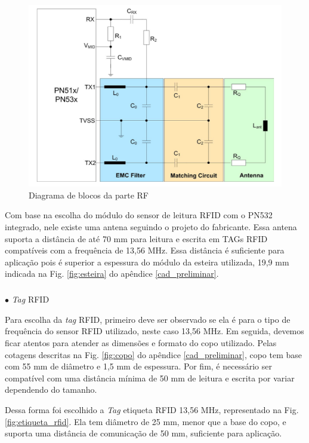     \begin{figure}[H]
    \centering
    \includegraphics[scale=0.55]{figuras/eletronica/esquematicos/antena_RFID.png}
    \caption{Diagrama de blocos da parte RF}
    \label{fig:antena_RFID}
    \end{figure}

   Com base na escolha do módulo do sensor de leitura RFID com o PN532 integrado, nele existe uma antena seguindo o projeto do fabricante. Essa antena suporta a distância de até 70 mm para leitura e escrita em TAGs RFID compatíveis com a frequência de 13,56 MHz. Essa distância é suficiente para aplicação pois é superior a espessura do módulo da esteira utilizada, 19,9 mm indicada na Fig. \ref{fig:esteira} do apêndice \ref{cad_preliminar}.
   
   \subparagraph*{} $\bullet$ \textit{Tag} RFID \hfill
   
   Para escolha da \textit{tag} RFID, primeiro deve ser observado se ela é para o tipo de frequência do sensor RFID utilizado, neste caso 13,56 MHz. Em seguida, devemos ficar atentos para atender as dimensões e formato do copo utilizado. Pelas cotagens descritas na Fig. \ref{fig:copo} do apêndice \ref{cad_preliminar},  copo tem base com 55 mm de diâmetro e 1,5 mm de espessura. Por fim, é necessário ser compatível com uma distância mínima de 50 mm de leitura e escrita por variar dependendo do tamanho.
   
   Dessa forma foi escolhido a \textit{Tag} etiqueta RFID 13,56 MHz, representado na Fig. \ref{fig:etiqueta_rfid}. Ela tem diâmetro de 25 mm, menor que a base do copo, e suporta uma distância de comunicação de 50 mm, suficiente para aplicação.

